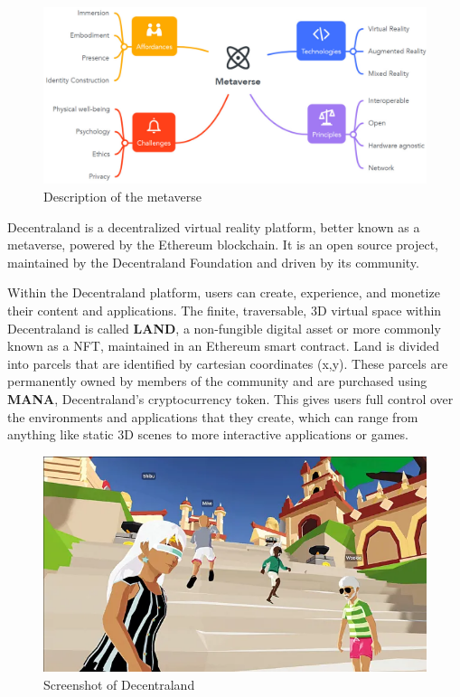 \documentclass[MSE,Master,english]{twbook}%
\begin{document}
\begin{figure}[H]
  \centering
  \includegraphics[width=\textwidth]{metaverse.png}
  \caption{Description of the metaverse \cite{metaverse}}
  \label{fig:metaverse}
\end{figure}

Decentraland\cite{DCL} is a decentralized virtual reality platform, better known as a metaverse, powered by the Ethereum blockchain. It is an open source project, maintained by the Decentraland Foundation and driven by its community. 

Within the Decentraland platform, users can create, experience, and monetize their content and applications. The finite, traversable, 3D virtual space within Decentraland is called \textbf{\gls{LAND}}, a non-fungible digital asset or more commonly known as a \ac{NFT}, maintained in an Ethereum smart contract. Land is divided into parcels that are identified by cartesian coordinates (x,y). These parcels are permanently owned by members of the community and are purchased using \textbf{\gls{MANA}}, Decentraland's cryptocurrency token. This gives users full control over the environments and applications that they create, which can range from anything like static 3D scenes to more interactive applications or games.

\begin{figure}[H]
  \centering
  \includegraphics[width=\textwidth]{dcl.png}
  \caption{Screenshot of Decentraland}
  \label{fig:dcl}
\end{figure}
\end{document}
